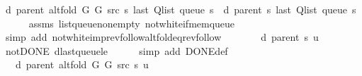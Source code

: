 \begin{isabellebody}
\ {\isachardoublequoteopen}d\ {\isacharparenleft}{\kern0pt}parent\ {\isacharparenleft}{\kern0pt}alt{\isacharunderscore}{\kern0pt}fold\ G{}\ G{}\ src\ s{\isacharparenright}{\kern0pt}{\isacharparenright}{\kern0pt}\ {\isacharparenleft}{\kern0pt}last\ {\isacharparenleft}{\kern0pt}Q{\isacharunderscore}{\kern0pt}list\ {\isacharparenleft}{\kern0pt}queue\ s{\isacharparenright}{\kern0pt}{\isacharparenright}{\kern0pt}{\isacharparenright}{\kern0pt}\ {\isacharequal}{\kern0pt}\ d\ {\isacharparenleft}{\kern0pt}parent\ s{\isacharparenright}{\kern0pt}\ {\isacharparenleft}{\kern0pt}last\ {\isacharparenleft}{\kern0pt}Q{\isacharunderscore}{\kern0pt}list\ {\isacharparenleft}{\kern0pt}queue\ s{\isacharparenright}{\kern0pt}{\isacharparenright}{\kern0pt}{\isacharparenright}{\kern0pt}{\isachardoublequoteclose}\isanewline
\ \ \ \ \isamarkupfalse%
\ assms\ list{\isacharunderscore}{\kern0pt}queue{\isacharunderscore}{\kern0pt}non{\isacharunderscore}{\kern0pt}empty\ not{\isacharunderscore}{\kern0pt}white{\isacharunderscore}{\kern0pt}if{\isacharunderscore}{\kern0pt}mem{\isacharunderscore}{\kern0pt}queue\isanewline
\ \ \ \ \isamarkupfalse%
\ {\isacharparenleft}{\kern0pt}simp\ add{\isacharcolon}{\kern0pt}\ not{\isacharunderscore}{\kern0pt}white{\isacharunderscore}{\kern0pt}imp{\isacharunderscore}{\kern0pt}rev{\isacharunderscore}{\kern0pt}follow{\isacharunderscore}{\kern0pt}alt{\isacharunderscore}{\kern0pt}fold{\isacharunderscore}{\kern0pt}eq{\isacharunderscore}{\kern0pt}rev{\isacharunderscore}{\kern0pt}follow{\isacharparenright}{\kern0pt}\isanewline
\ \ \isamarkupfalse%
\ \isamarkupfalse%
\ {\isachardoublequoteopen}{\isachardot}{\kern0pt}{\isachardot}{\kern0pt}{\isachardot}{\kern0pt}\ {\isasymle}\ d\ {\isacharparenleft}{\kern0pt}parent\ s{\isacharparenright}{\kern0pt}\ {\isacharquery}{\kern0pt}u\ {\isacharplus}{\kern0pt}\ {}{\isachardoublequoteclose}\isanewline
\ \ \ \ \isamarkupfalse%
\ not{\isacharunderscore}{\kern0pt}DONE\ d{\isacharunderscore}{\kern0pt}last{\isacharunderscore}{\kern0pt}queue{\isacharunderscore}{\kern0pt}le\isanewline
\ \ \ \ \isamarkupfalse%
\ {\isacharparenleft}{\kern0pt}simp\ add{\isacharcolon}{\kern0pt}\ DONE{\isacharunderscore}{\kern0pt}def{\isacharparenright}{\kern0pt}\isanewline
\ \ \isamarkupfalse%
\ \isamarkupfalse%
\ {\isachardoublequoteopen}{\isachardot}{\kern0pt}{\isachardot}{\kern0pt}{\isachardot}{\kern0pt}\ {\isacharequal}{\kern0pt}\ d\ {\isacharparenleft}{\kern0pt}parent\ {\isacharparenleft}{\kern0pt}alt{\isacharunderscore}{\kern0pt}fold\ G{}\ G{}\ src\ s{\isacharparenright}{\kern0pt}{\isacharparenright}{\kern0pt}\ {\isacharquery}{\kern0pt}u\ {\isacharplus}{\kern0pt}\ {}{\isachardoublequoteclose}\isanewline

\end{isabellebody}
